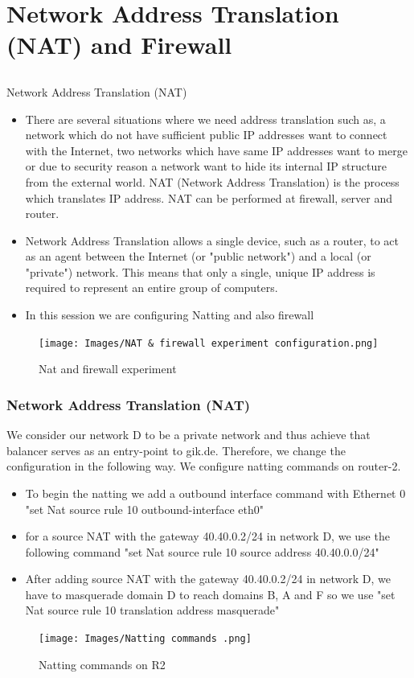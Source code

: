 \chapter{Network Address Translation (NAT) and Firewall}
\section{}{Network Address Translation (NAT)}
\begin{itemize}
\item There are several situations where we need address translation such as, a network which do not have sufficient public IP addresses want to connect with the Internet, two networks which have same IP addresses want to merge or due to security reason a network want to hide its internal IP structure from the external world. NAT (Network Address Translation) is the process which translates IP address. NAT can be performed at firewall, server and router.
\item Network Address Translation allows a single device, such as a router, to act as an agent between the Internet (or "public network") and a local (or "private") network. This means that only a single, unique IP address is required to represent an entire group of computers.
\item In this session we are configuring Natting and also firewall
\end{itemize}

\begin{figure}[H]
\centering
  \texttt{[image: Images/NAT \& firewall experiment configuration.png]}
  \caption{Nat and firewall experiment}
  \label{fig }
\end{figure}

\subsection{Network Address Translation (NAT)}
We consider our network D to be a private network and thus achieve that
balancer serves as an entry-point to gik.de. Therefore, we change the configuration in the following way.
We configure natting commands on router-2.
\begin{itemize}
\item To begin the natting we add a outbound interface command with Ethernet 0 
"set Nat source rule 10 outbound-interface eth0"
\item for a source NAT with the gateway 40.40.0.2/24 in network D, we use the following command "set Nat source rule 10  source address 40.40.0.0/24"
\item After adding source NAT with the gateway 40.40.0.2/24 in network D, we have to masquerade domain D to reach domains B, A and F so we use "set Nat source rule 10 translation address masquerade"
\end{itemize}
\begin{figure}[H]
\centering
  \texttt{[image: Images/Natting commands .png]}
  \caption{Natting commands on R2}
  \label{fig }
\end{figure}

